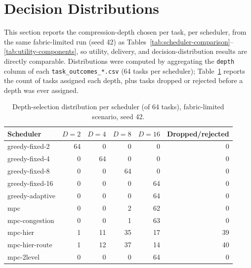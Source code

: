 \section{Decision Distributions}
\label{sec:decisions}

This section reports the compression-depth chosen per task, per scheduler,
from the same fabric-limited run (seed 42) as
Tables~\ref{tab:scheduler-comparison}--\ref{tab:utility-components}, so
utility, delivery, and decision-distribution results are directly
comparable. Distributions were computed by aggregating the \texttt{depth}
column of each \texttt{task\_outcomes\_*.csv} (64 tasks per scheduler);
Table~\ref{tab:depth-dist} reports the count of tasks assigned each depth,
plus tasks dropped or rejected before a depth was ever assigned.

\begin{table}[h]
\centering
\caption{Depth-selection distribution per scheduler (of 64 tasks), fabric-limited scenario, seed 42.}
\label{tab:depth-dist}
\begin{tabular}{lrrrrr}
\toprule
Scheduler & $D{=}2$ & $D{=}4$ & $D{=}8$ & $D{=}16$ & Dropped/rejected \\
\midrule
greedy-fixed-2   & 64 & 0  & 0  & 0  & 0 \\
greedy-fixed-4   & 0  & 64 & 0  & 0  & 0 \\
greedy-fixed-8   & 0  & 0  & 64 & 0  & 0 \\
greedy-fixed-16  & 0  & 0  & 0  & 64 & 0 \\
greedy-adaptive  & 0  & 0  & 0  & 64 & 0 \\
mpc              & 0  & 0  & 2  & 62 & 0 \\
mpc-congestion   & 0  & 0  & 1  & 63 & 0 \\
mpc-hier         & 1  & 11 & 35 & 17 & 39 \\
mpc-hier-route   & 1  & 12 & 37 & 14 & 40 \\
mpc-2level       & 0  & 0  & 0  & 64 & 0 \\
\bottomrule
\end{tabular}
\end{table}

